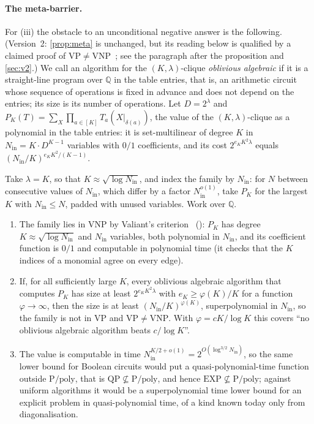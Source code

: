 \documentclass[10pt]{amsart}
\theoremstyle{plain}
\theoremstyle{definition}
\theoremstyle{remark}
\numberwithin{equation}{section}
\newcommand{\Q}{\mathbb{Q}}
\begin{document}
\paragraph{The meta-barrier.} For (iii) the obstacle to an unconditional negative answer is the
following. (Version~2: \cref{prop:meta} is unchanged, but its reading below is qualified by a
claimed proof of $\mathrm{VP}\ne\mathrm{VNP}$~\cite{AnthropicVP26}; see the paragraph after the
proposition and \cref{sec:v2}.) We call an algorithm for the $(K,\lambda)$-clique \emph{oblivious algebraic} if it is a
straight-line program over $\Q$ in the table entries, that is, an arithmetic circuit whose sequence of
operations is fixed in advance and does not depend on the entries; its size is its number of
operations. Let $D=2^\lambda$ and $P_K(T)=\sum_X\prod_{a\in[K]}T_a(X|_{\delta(a)})$, the value of the
$(K,\lambda)$-clique as a polynomial in the table entries: it is set-multilinear of degree $K$ in
$N_{\mathrm{in}}=K\cdot D^{K-1}$ variables with $0/1$ coefficients, and its cost $2^{e_KK^2\lambda}$ equals
$(N_{\mathrm{in}}/K)^{e_KK^2/(K-1)}$.

\begin{proposition}\label{prop:meta}
Take $\lambda=K$, so that $K\approx\sqrt{\log N_{\mathrm{in}}}$, and index the family by $N_{\mathrm{in}}$:
for $N$ between consecutive values of $N_{\mathrm{in}}$, which differ by a factor
$N_{\mathrm{in}}^{o(1)}$, take $P_K$ for the largest $K$ with $N_{\mathrm{in}}\le N$, padded with unused
variables. Work over $\Q$.
\begin{enumerate}[label=(\roman*)]
\item The family lies in $\mathrm{VNP}$ by Valiant's criterion~\cite{Valiant79a}
(\cite[Proposition~2.20]{Burgisser00}): $P_K$ has degree $K\approx\sqrt{\log N_{\mathrm{in}}}$ and
$N_{\mathrm{in}}$ variables, both polynomial in $N_{\mathrm{in}}$, and its coefficient function is $0/1$
and computable in polynomial time (it checks that the $K$ indices of a monomial agree on every edge).
\item If, for all sufficiently large $K$, every oblivious algebraic algorithm that computes $P_K$ has size
at least $2^{e_KK^2\lambda}$ with $e_K\ge\varphi(K)/K$ for a function $\varphi\to\infty$, then the size
is at least $(N_{\mathrm{in}}/K)^{\varphi(K)}$, superpolynomial in $N_{\mathrm{in}}$, so the family is not in
$\mathrm{VP}$ and $\mathrm{VP}\ne\mathrm{VNP}$. With $\varphi=cK/\log K$ this covers ``no oblivious
algebraic algorithm beats $c/\log K$''.
\item The value is computable in time $N_{\mathrm{in}}^{K/2+o(1)}=2^{O(\log^{3/2}N_{\mathrm{in}})}$, so the same
lower bound for Boolean circuits would put a quasi-polynomial-time function outside
$\mathrm P/\mathrm{poly}$, that is $\mathrm{QP}\not\subseteq\mathrm P/\mathrm{poly}$, and hence
$\mathrm{EXP}\not\subseteq\mathrm P/\mathrm{poly}$; against uniform algorithms it would be a
superpolynomial time lower bound for an explicit problem in quasi-polynomial time, of a kind known
today only from diagonalisation.
\end{enumerate}
\end{proposition}
\end{document}
